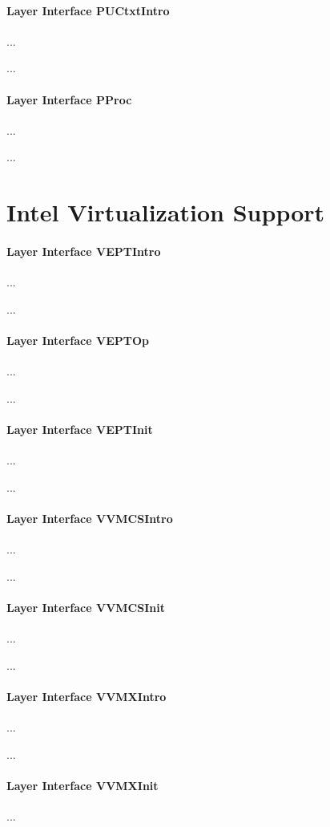 \paragraph{Layer Interface PUCtxtIntro}
...

...

\paragraph{Layer Interface PProc}
...

...

\section{Intel Virtualization Support}

\paragraph{Layer Interface VEPTIntro}
...

...

\paragraph{Layer Interface VEPTOp}
...

...

\paragraph{Layer Interface VEPTInit}
...

...

\paragraph{Layer Interface VVMCSIntro}
...

...

\paragraph{Layer Interface VVMCSInit}
...

...

\paragraph{Layer Interface VVMXIntro}
...

...

\paragraph{Layer Interface VVMXInit}
...

